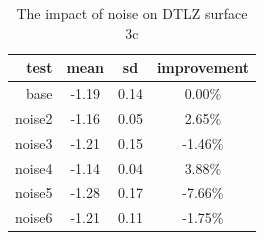 \begin{table}[h]
  \centering
  \caption{The impact of noise on DTLZ surface 3c}
  \label{t:noise3}
  \begin{tabular}{r c c c}
    \hline
    test & mean & sd & improvement  \\
    \hline
    \hline
    base & -1.19 & 0.14 & 0.00\%     \\
    noise2 & -1.16 & 0.05 & 2.65\%   \\
    noise3 & -1.21 & 0.15 & -1.46\%  \\
    noise4 & -1.14 & 0.04 & 3.88\%   \\
    noise5 & -1.28 & 0.17 & -7.66\%  \\
    noise6 & -1.21 & 0.11 & -1.75\%  \\
    \hline
  \end{tabular}
\end{table}

\clearpage{}
